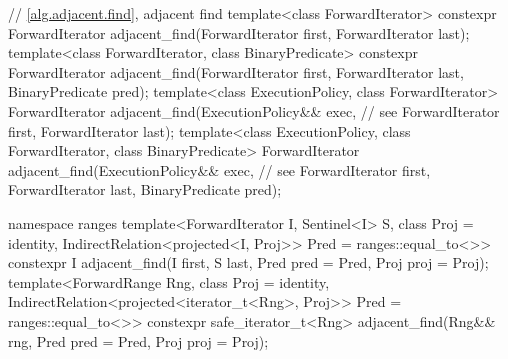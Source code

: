\begin{codeblock}
  // \ref{alg.adjacent.find}, adjacent find
  template<class ForwardIterator>
    constexpr ForwardIterator
      adjacent_find(ForwardIterator first, ForwardIterator last);
  template<class ForwardIterator, class BinaryPredicate>
    constexpr ForwardIterator
      adjacent_find(ForwardIterator first, ForwardIterator last,
                    BinaryPredicate pred);
  template<class ExecutionPolicy, class ForwardIterator>
    ForwardIterator
      adjacent_find(ExecutionPolicy&& exec, // see 
                    ForwardIterator first, ForwardIterator last);
  template<class ExecutionPolicy, class ForwardIterator, class BinaryPredicate>
    ForwardIterator
      adjacent_find(ExecutionPolicy&& exec, // see 
                    ForwardIterator first, ForwardIterator last,
                    BinaryPredicate pred);
\end{codeblock}\begin{addedblock}\begin{codeblock}
  namespace ranges {
    template<ForwardIterator I, Sentinel<I> S, class Proj = identity,
        IndirectRelation<projected<I, Proj>> Pred = ranges::equal_to<>>
      constexpr I adjacent_find(I first, S last, Pred pred = Pred{},
                                Proj proj = Proj{});
    template<ForwardRange Rng, class Proj = identity,
        IndirectRelation<projected<iterator_t<Rng>, Proj>> Pred = ranges::equal_to<>>
      constexpr safe_iterator_t<Rng>
        adjacent_find(Rng&& rng, Pred pred = Pred{}, Proj proj = Proj{});
  }
\end{codeblock}\end{addedblock}\begin{codeblock}


\end{codeblock}
